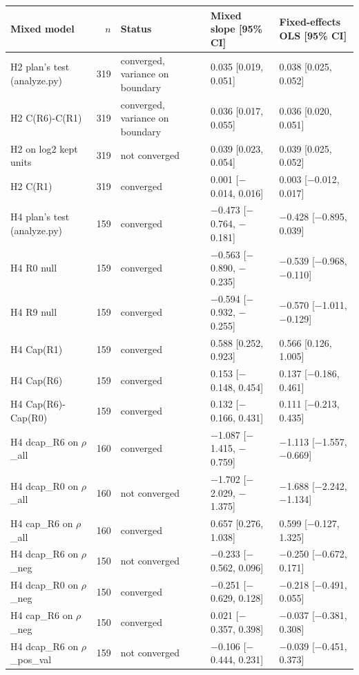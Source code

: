 \begin{tabular}{@{}l r >{\raggedright\arraybackslash}p{1.7cm} l l@{}}
\toprule
Mixed model & $n$ & Status & Mixed slope [95\% CI] & Fixed-effects OLS [95\% CI] \\
\midrule
H2 plan's test (analyze.py) & 319 & converged, variance on boundary & 0.035 [0.019, 0.051] & 0.038 [0.025, 0.052] \\
H2 C(R6)-C(R1) & 319 & converged, variance on boundary & 0.036 [0.017, 0.055] & 0.036 [0.020, 0.051] \\
H2 on log2 kept units & 319 & not converged & 0.039 [0.023, 0.054] & 0.039 [0.025, 0.052] \\
H2 C(R1) & 319 & converged & 0.001 [$-$0.014, 0.016] & 0.003 [$-$0.012, 0.017] \\
H4 plan's test (analyze.py) & 159 & converged & $-$0.473 [$-$0.764, $-$0.181] & $-$0.428 [$-$0.895, 0.039] \\
H4 R0 null & 159 & converged & $-$0.563 [$-$0.890, $-$0.235] & $-$0.539 [$-$0.968, $-$0.110] \\
H4 R9 null & 159 & converged & $-$0.594 [$-$0.932, $-$0.255] & $-$0.570 [$-$1.011, $-$0.129] \\
H4 Cap(R1) & 159 & converged & 0.588 [0.252, 0.923] & 0.566 [0.126, 1.005] \\
H4 Cap(R6) & 159 & converged & 0.153 [$-$0.148, 0.454] & 0.137 [$-$0.186, 0.461] \\
H4 Cap(R6)-Cap(R0) & 159 & converged & 0.132 [$-$0.166, 0.431] & 0.111 [$-$0.213, 0.435] \\
H4 dcap\_R6 on $\rho$\_all & 160 & converged & $-$1.087 [$-$1.415, $-$0.759] & $-$1.113 [$-$1.557, $-$0.669] \\
H4 dcap\_R0 on $\rho$\_all & 160 & not converged & $-$1.702 [$-$2.029, $-$1.375] & $-$1.688 [$-$2.242, $-$1.134] \\
H4 cap\_R6 on $\rho$\_all & 160 & converged & 0.657 [0.276, 1.038] & 0.599 [$-$0.127, 1.325] \\
H4 dcap\_R6 on $\rho$\_neg & 150 & not converged & $-$0.233 [$-$0.562, 0.096] & $-$0.250 [$-$0.672, 0.171] \\
H4 dcap\_R0 on $\rho$\_neg & 150 & converged & $-$0.251 [$-$0.629, 0.128] & $-$0.218 [$-$0.491, 0.055] \\
H4 cap\_R6 on $\rho$\_neg & 150 & converged & 0.021 [$-$0.357, 0.398] & $-$0.037 [$-$0.381, 0.308] \\
H4 dcap\_R6 on $\rho$\_pos\_val & 159 & not converged & $-$0.106 [$-$0.444, 0.231] & $-$0.039 [$-$0.451, 0.373] \\

\end{tabular}
